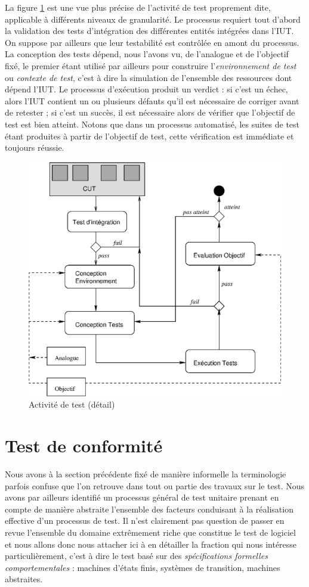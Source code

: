 La figure \ref{fig-processtest} est une vue plus pr\'ecise de
l'activit\'e de test proprement dite, applicable \`a diff\'erents niveaux de
granularit\'e. Le processus requiert tout d'abord la validation des
tests d'int\'egration des diff\'erentes entit\'es int\'egr\'ees
dans l'\textsf{IUT}. On suppose par ailleurs que leur testabilit\'e est
contr\^ol\'ee en amont du processus. La conception des tests
d\'epend, nous l'avons vu, de l'analogue et de l'objectif fix\'e, le
premier \'etant utilis\'e par ailleurs pour construire
l'\emph{environnement de test} ou \emph{contexte de test}, c'est \`a
dire la simulation de l'ensemble des ressources dont d\'epend
l'\textsf{IUT}. Le processus d'ex\'ecution produit un verdict : si c'est un
\'echec, alors l'\textsf{IUT} contient un ou plusieurs d\'efauts qu'il est
n\'ecessaire de corriger avant de retester ; si c'est un succ\`es,
il est n\'ecessaire alors de v\'erifier que l'objectif de test est
bien atteint. Notons que dans un processus automatis\'e, les suites
de test \'etant produites  \`a partir de l'objectif de test, cette
v\'erification est imm\'ediate et toujours r\'eussie.

\begin{figure}[htbp]
    \centering
    \includegraphics[width=.6\textwidth]{figures/fig-processtest.eps}
    \caption{Activit\'e de test (d\'etail)}
    \label{fig-processtest}
\end{figure}

\section{Test de conformit\'e}

Nous avons \`a la section pr\'ec\'edente fix\'e de mani\`ere
informelle la terminologie parfois confuse que l'on retrouve dans tout
ou partie des travaux sur le test. Nous avons par ailleurs identifi\'e un processus
g\'en\'eral de test unitaire prenant en compte de mani\`ere
abstraite l'ensemble des facteurs conduisant \`a la r\'ealisation
effective d'un processus de test. Il n'est clairement pas question de
passer en revue l'ensemble du domaine extr\^emement riche que
constitue le test de logiciel et nous allons donc nous attacher ici
\`a en d\'etailler la fraction qui nous int\'eresse
particuli\`erement, c'est \`a dire le test bas\'e sur des
\emph{sp\'ecifications formelles comportementales} : machines
d'\'etats finis, syst\`emes de transition, machines abstraites.

